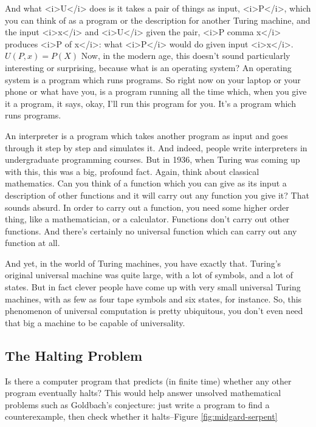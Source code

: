 \documentclass[]{article}
\begin{document}
And what <i>U</i> does
is it takes a pair of things as input,
<i>P</i>, which you can think of
as a program
or the description for
another Turing machine,
and the input <i>x</i>
and <i>U</i> given the pair,
<i>P comma x</i>
produces
<i>P of x</i>:
what <i>P</i> would do
given input <i>x</i>.
$U(P,x)=P(X)$
Now, in the modern age,
this doesn't sound particularly
interesting or surprising,
because what is an operating system?
An operating system is a program
which runs programs.
So right now on your laptop
or your phone
or what have you,
is a program running all the time
which, when you give it a program,
it says, okay, I'll run this program
for you.
It's a program which runs programs.

An interpreter
is a program
which takes another program as input
and goes through it step by step
and simulates it.
And indeed,
people write interpreters
in undergraduate programming courses.
But in 1936,
when Turing was coming up with this,
this was a big, profound fact.
Again, think about
classical mathematics.
Can you think of a function
which you can give as its input
a description of other functions
and it will carry out any function
you give it?
That sounds absurd.
In order to carry out a function,
you need some higher order thing,
like a mathematician,
or a calculator.
Functions don't carry out
other functions.
And there's certainly no
universal function
which can carry out
any function at all.

And yet,
in the world of Turing machines,
you have exactly that.
Turing's original universal machine
was quite large,
with a lot of symbols,
and a lot of states.
But in fact clever people
have come up with very small
universal Turing machines,
with as few as four tape symbols
and six states,
for instance.
So, this phenomenon of
universal computation
is pretty ubiquitous,
you don't even need
that big a machine
to be capable of universality.

\subsection{The Halting Problem}

Is there a computer program that predicts (in finite time) whether any other program eventually halts? This would help answer unsolved mathematical problems such as Goldbach's conjecture: just write a program to find a counterexample, then check whether it halts--Figure \ref{fig:midgard-serpent}
\end{document}
